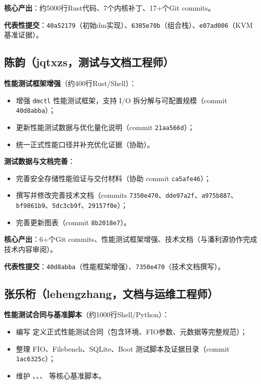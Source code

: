 \textbf{核心产出}：约5000行Rust代码、7个内核补丁、17+个Git commits。

\textbf{代表性提交}：\texttt{40a52179}（初始dm实现）、\texttt{6385e70b}（组合栈）、\texttt{e07ad006}（KVM基准证据）。

\subsection{陈韵（jqtxzs，测试与文档工程师）}

\textbf{性能测试框架增强}（约400行Rust/Shell）：
\begin{itemize}
    \item 增强 \texttt{dmctl} 性能测试框架，支持 I/O 拆分解与可配置规模（commit \texttt{40d8abba}）；
    \item 更新性能测试数据与优化量化说明（commit \texttt{21aa566d}）；
    \item 统一正式性能口径并补充优化证据（协助）。
\end{itemize}

\textbf{测试数据与文档完善}：
\begin{itemize}
    \item 完善安全存储性能验证与交付材料（协助 commit \texttt{ca5afe46}）；
    \item 撰写并修改完善技术文档（commits \texttt{7350e470}、\texttt{dde97a2f}、\texttt{a975b887}、\texttt{bf9861b9}、\texttt{5dc3cb9f}、\texttt{29157f0e}）；
    \item 完善更新图表（commit \texttt{8b2018e7}）。
\end{itemize}

\textbf{核心产出}：6+个Git commits、性能测试框架增强、技术文档（与潘利源协作完成技术内容审阅）。

\textbf{代表性提交}：\texttt{40d8abba}（性能框架增强）、\texttt{7350e470}（技术文档撰写）。

\subsection{张乐桁（lehengzhang，文档与运维工程师）}

\textbf{性能测试合同与基准脚本}（约1000行Shell/Python）：
\begin{itemize}
    \item 编写 \texttt{} 定义正式性能测试合同（包含环境、FIO参数、元数据等完整规范）；
    \item 整理 FIO、Filebench、SQLite、Boot 测试脚本及证据目录（commit \texttt{1ac6325c}）；
    \item 维护 \texttt{}、\texttt{}、\texttt{}、\texttt{} 等核心基准脚本。
\end{itemize}

